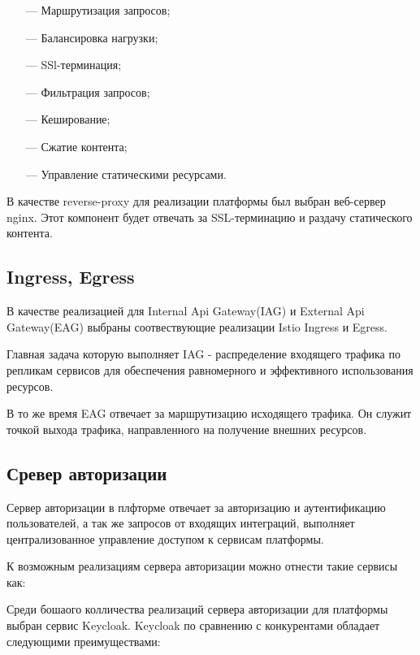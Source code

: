\begin{itemize}
  \item[---] Маршрутизация запросов;
  \item[---] Балансировка нагрузки;
  \item[---] SSl-терминация;
  \item[---] Фильтрация запросов;
  \item[---] Кеширование;
  \item[---] Сжатие контента;
  \item[---] Управление статическими ресурсами. 
\end{itemize}

В качестве reverse-proxy для реализации платформы был выбран веб-сервер nginx. Этот компонент будет отвечать за SSL-терминацию и раздачу статического контента.

\subsection{Ingress, Egress}

В качестве реализацией для Internal Api Gateway(IAG) и External Api Gateway(EAG) выбраны соотвествующие реализации Istio Ingress и Egress.

Главная задача которую выполняет IAG - распределение входящего трафика по репликам сервисов для обеспечения равномерного и эффективного использования ресурсов.

В то же время EAG отвечает за маршрутизацию исходящего трафика. Он служит точкой выхода трафика, направленного на получение внешних ресурсов.

\subsection{Сревер авторизации}

Сервер авторизации в плфторме отвечает за авторизацию и аутентификацию пользователей, а так же запросов от входящих интеграций, выполняет централизованное управление доступом к сервисам платформы. 

К возможным реализациям сервера авторизации можно отнести такие сервисы как:

Среди бошаого колличества реализаций сервера авторизации для платформы выбран сервис Keycloak. Keycloak по сравнению с конкурентами обладает следующими преимуществами:

